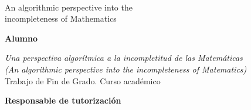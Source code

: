 

\thispagestyle{empty}

\begin{center}
  \large  


  \begingroup
  \huge{\miTitulo} \\[18pt]
  \Large{An algorithmic perspective into the\\ incompleteness of Mathematics}
  \bigskip
  \endgroup

  \textrm{\miNombre}


\end{center}  

\newpage
\thispagestyle{empty}

\hfill

\vfill

\textbf{Alumno}\\
\miNombre
\medskip

\emph{Una perspectiva algorítmica a la incompletitud de las Matemáticas\\(An algorithmic perspective into the incompleteness of Matematics)}\\
Trabajo de Fin de Grado. Curso académico \miCurso
\bigskip

\begin{minipage}[t]{0.45\textwidth} %
  \flushleft
  \textbf{Responsable de tutorización}\\
  \medskip
  \miTutor
\end{minipage}
\begin{minipage}[t]{0.10\textwidth} %
  \hspace{1cm}
\end{minipage}
\begin{minipage}[t]{0.45\textwidth} %
  \flushright
  \textbf{\miGrado}
  \medskip

  \miFacultadNoSpace
  \medskip

  \miUniversidad
\end{minipage}

\newpage
\endinput

